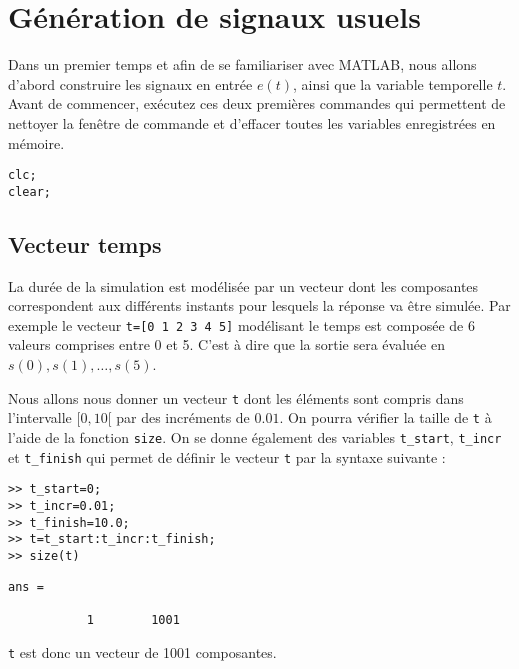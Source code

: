 \section{Génération de signaux usuels}
Dans un premier temps et afin de se familiariser avec MATLAB, nous 
allons d'abord construire les signaux en entrée $e(t)$, 
ainsi que la variable temporelle $t$.
Avant de commencer, exécutez ces deux premières commandes qui permettent de 
nettoyer la fenêtre de commande et d'effacer toutes les variables 
enregistrées en mémoire.
\begin{verbatim}
clc;
clear;
\end{verbatim}
\subsection{Vecteur temps}
La durée de la simulation est modélisée par un vecteur dont les composantes 
correspondent aux différents instants pour lesquels la réponse va être 
simulée. Par exemple le vecteur \texttt{t=[0 1 2 3 4 5]} modélisant le temps est
composée de 6 valeurs comprises entre 0 et 5. 
C'est à dire que la sortie sera évaluée en $s(0),s(1),\ldots,s(5)$.

Nous allons nous donner un vecteur \texttt{t} dont les éléments sont 
compris dans l'intervalle $[0,10[$ par des incréments de $0.01$. 
On pourra vérifier la taille de \texttt{t} à l'aide de la 
fonction \texttt{size}. On se donne également des variables \texttt{t\_start}, 
\texttt{t\_incr} et \texttt{t\_finish} qui permet de définir le vecteur 
\texttt{t} par la syntaxe suivante :
\begin{verbatim}
>> t_start=0;
>> t_incr=0.01;
>> t_finish=10.0;
>> t=t_start:t_incr:t_finish;
>> size(t)
\end{verbatim}

\begin{verbatim}
ans =

           1        1001
\end{verbatim}
\texttt{t} est donc un vecteur de 1001 composantes.
